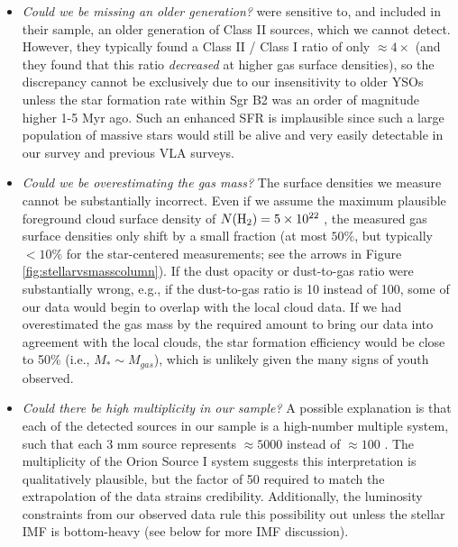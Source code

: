\documentclass[twocolumn]{aastex61}
\begin{document}
\begin{itemize}
    \item \emph{Could we be missing an older generation?}
        \citet{Gutermuth2011a} were sensitive to, and included in their sample,
        an older generation of Class II sources, which we cannot detect.
        However, they typically found a Class II / Class I ratio of only
        $\approx4\times$ \citep{Gutermuth2009a} (and they found that this
        ratio \emph{decreased} at higher gas surface densities), so the
        discrepancy cannot be exclusively due to our insensitivity to older
        YSOs unless the star formation rate within Sgr B2 was an order of
        magnitude higher 1-5 Myr ago.  Such an enhanced SFR is implausible
        since such a large population of massive stars would still be alive and
        very easily detectable in our survey and previous VLA surveys. 

    \item \emph{Could we be overestimating the gas mass?}
        The surface densities we measure cannot be substantially incorrect.
        Even if we assume the maximum plausible foreground cloud surface
        density of $N(\textrm{H}_{2})=5\times10^{22}$ \persc, the measured gas surface densities
        only shift by a small fraction (at most $50\%$, but typically $<10\%$
        for the star-centered measurements; see the arrows in Figure
        \ref{fig:stellarvsmasscolumn}).
        If the dust opacity or dust-to-gas ratio were substantially wrong,
        e.g., if the dust-to-gas ratio is 10 instead of 100, some of
        our data would begin to overlap with the local cloud data.
        If we had overestimated the gas mass by the required amount to
        bring our data into agreement with the local clouds, the star
        formation efficiency would be close to 50\% (i.e., $M_*\sim M_{gas}$),
        which is unlikely given the many signs of youth observed.

    \item \emph{Could there be high multiplicity in our sample?} 
        A possible explanation is that each of the detected sources in our
        sample is a high-number multiple system, such that each 3 mm source
        represents $\approx5000$ \msun instead of $\approx100$ \msun.  The
        multiplicity of the Orion Source I system suggests this interpretation
        is qualitatively plausible, but the factor of 50 required to match the
        extrapolation of the \citet{Gutermuth2011a} data strains credibility.
        Additionally, the luminosity constraints from our observed data
        rule this possibility out unless the stellar IMF is bottom-heavy
        (see below for more IMF discussion).


\end{itemize}
\end{document}
